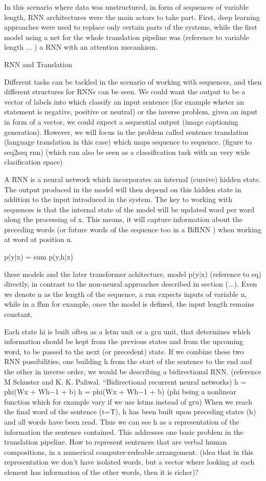 \documentclass[11pt,english,listoffigures,listoftables]{tfgetsinf}
\begin{document}
In this scenario where data was unstructured, in form of sequences of variable length, RNN architectures were the main actors to take part.
First, deep learning approaches were used to replace only certain parts of the systems, while the first model using a net for the whole translation pipeline was (reference to variable length ... ) a RNN with an attention mecanhism.


RNN and Translation

Different tasks can be tackled in the scenario of working with sequences, and then different structures for RNNs can be seen. We could want the output to be a vector of labels into which classify an input sentence (for example wheter an statement is negative, positive or neutral) or the inverse problem, given an input in form of a vector, we could expect a sequential output (image captioning generation). However, we will focus in the problem called sentence translation (language translation in this case) which maps sequence to sequence. (figure to seq2seq rnn) (which can also be seen as a classification task with an very wide clasification space)

A RNN is a neural network which incorporates an internal (cursive) hidden state. The output produced in the model will then depend on this hidden state in addition to the input introduced in the system.
The key to working with sequences is that the internal state of the model will be updated word per word along the processing of x. %
This means, it will capture information about the preceding words (or future words of the sequence too in a BiRNN \cite{650093}) when working at word at position n.

p(y|x) = sum p(y,h|x)

these models and the later transformer  achitecture, model p(y|x) (reference to eq) directly, in contrast to the non-neural approaches described in section (...). Even we denote n as the length of the sequence, a rnn expects inputs of variable n, while in a ffnn for example, once the model is defined, the input length remains constant.

Each state hi is built often as a lstm unit or a gru unit, that determines which information should be kept from the previous states and from the upcoming word, to be passed to the next (or precedent) state. If we combine these two RNN possibilities, one building h from the start of the sentence to the end and the other in inverse order, we would be describing a bidirectional RNN. (reference M Schuster and K. K. Paliwal. “Bidirectional recurrent neural networks)
 h = phi(Wx + Wh−1 + b)
 h = phi(Wx + Wh−1 + b)
 (phi being a nonlinear function which for example vary if we use lstms instead of gru)
 When we reach the final word of the sentence (t=T), h has been built upon preceding states (h) and all words have been read. Thus we can see h as a representation of the information the sentence contained.
This addresses one basic problem in the translation pipeline. How to represent sentences that are verbal human compositions, in a numerical computer-redeable arrangement.
(idea that in this representation we don't have isolated words, but a vector where looking at each element has information of the other words, then it is richer)?
\end{document}
